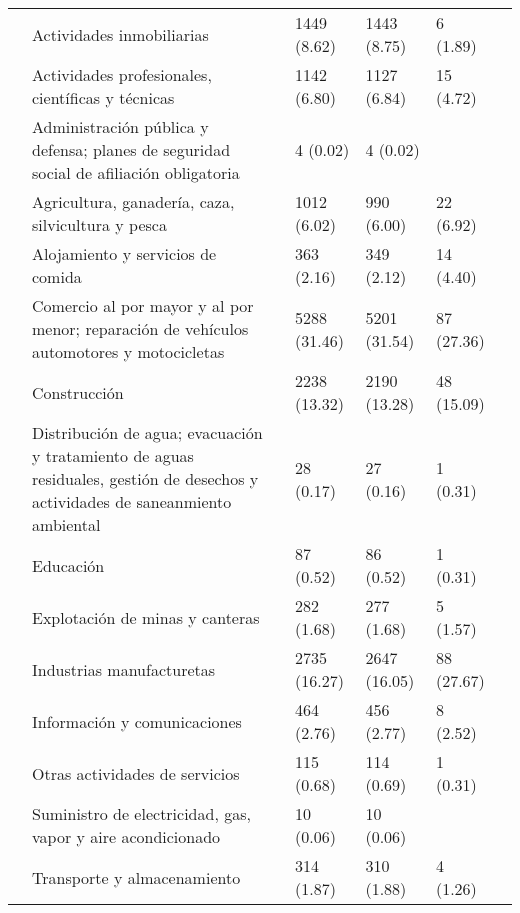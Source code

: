 \begin{tabular}{lllllll}
{{ & Actividades inmobiliarias &  & 1449 (8.62) & 1443 (8.75) & 6 (1.89) &  \\
 & Actividades profesionales,  científicas y técnicas &  & 1142 (6.80) & 1127 (6.84) & 15 (4.72) &  \\
 & Administración pública y defensa; planes de seguridad social de afiliación obligatoria &  & 4 (0.02) & 4 (0.02) &  &  \\
 & Agricultura, ganadería, caza, silvicultura y pesca &  & 1012 (6.02) & 990 (6.00) & 22 (6.92) &  \\
 & Alojamiento y servicios de comida &  & 363 (2.16) & 349 (2.12) & 14 (4.40) &  \\
 & Comercio al por mayor y al por menor; reparación de vehículos automotores y motocicletas &  & 5288 (31.46) & 5201 (31.54) & 87 (27.36) &  \\
 & Construcción &  & 2238 (13.32) & 2190 (13.28) & 48 (15.09) &  \\
 & Distribución de agua; evacuación y tratamiento de aguas residuales, gestión de desechos y actividades de saneanmiento ambiental &  & 28 (0.17) & 27 (0.16) & 1 (0.31) &  \\
 & Educación &  & 87 (0.52) & 86 (0.52) & 1 (0.31) &  \\
 & Explotación de minas y canteras &  & 282 (1.68) & 277 (1.68) & 5 (1.57) &  \\
 & Industrias manufacturetas &  & 2735 (16.27) & 2647 (16.05) & 88 (27.67) &  \\
 & Información y comunicaciones &  & 464 (2.76) & 456 (2.77) & 8 (2.52) &  \\
 & Otras actividades de servicios &  & 115 (0.68) & 114 (0.69) & 1 (0.31) &  \\
 & Suministro de electricidad, gas, vapor y aire acondicionado &  & 10 (0.06) & 10 (0.06) &  &  \\
 & Transporte y almacenamiento &  & 314 (1.87) & 310 (1.88) & 4 (1.26) &  \\
\cline{1-7}
\bottomrule
\end{tabular}
